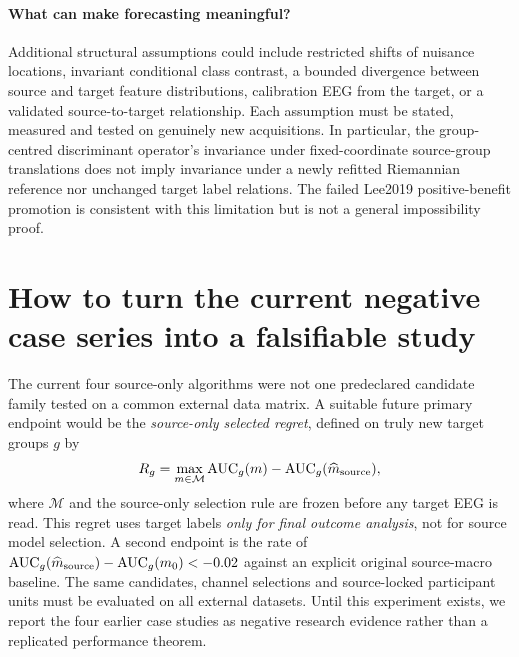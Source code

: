 \paragraph{What can make forecasting meaningful?}
Additional structural assumptions could include
restricted shifts of nuisance locations,
invariant conditional class contrast,
a bounded divergence between source and target
feature distributions, calibration EEG from the
target, or a validated source-to-target relationship.
Each assumption must be stated, measured and
tested on genuinely new acquisitions.
In particular, the group-centred discriminant
operator's invariance under fixed-coordinate
source-group translations does not imply
invariance under a newly refitted Riemannian
reference nor unchanged target label relations.
The failed Lee2019 positive-benefit promotion
is consistent with this limitation but
is not a general impossibility proof.

\section{How to turn the current negative case series into a falsifiable study}
The current four source-only algorithms were not
one predeclared candidate family tested
on a common external data matrix.
A suitable future primary endpoint would be
the \emph{source-only selected regret},
defined on truly new target groups $g$ by
\[
 R_g=\max_{m\in\mathcal M}
        \mathrm{AUC}_g(m)-
        \mathrm{AUC}_g(\widehat m_{\rm source}),
\]
where $\mathcal M$ and the source-only
selection rule are frozen before any target
EEG is read. This regret uses target labels
\emph{only for final outcome analysis},
not for source model selection.
A second endpoint is the rate of
$\mathrm{AUC}_g(\widehat m_{\rm source})-
\mathrm{AUC}_g(m_0)<-0.02$ against an
explicit original source-macro baseline.
The same candidates, channel selections
and source-locked participant units must
be evaluated on all external datasets.
Until this experiment exists, we report
the four earlier case studies as negative
research evidence rather than a replicated
performance theorem.
